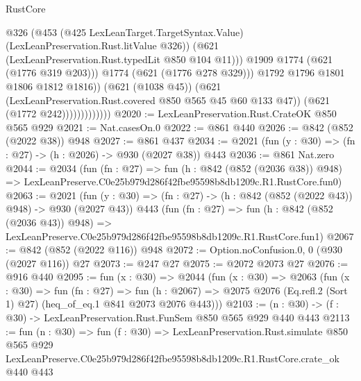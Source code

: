 \begin{lexlean}{RustCore}
\begin{coremodule}
                                    @326
                                    (@453
                                      (@425 LexLeanTarget.TargetSyntax.Value)
                                      (LexLeanPreservation.Rust.litValue @326))
                                    (@621 (LexLeanPreservation.Rust.typedLit @850 @104 @11)))
                                  @1909
                                  @1774
                                  (@621 (@1776 @319 @203)))
                                @1774
                                (@621 (@1776 @278 @329)))
                              @1792
                              @1796
                              @1801
                              @1806
                              @1812
                              @1816))
                          (@621 (@1038 @45))
                          (@621 (LexLeanPreservation.Rust.covered @850 @565 @45 @60 @133 @47))
                          (@621 (@1772 @242)))))))))))))
@2020 := LexLeanPreservation.Rust.CrateOK @850 @565 @929
@2021 := Nat.casesOn.{0}
@2022 := @861 @440
@2026 := @842 (@852 (@2022 @38)) @948
@2027 := @861 @437
@2034 := @2021 (fun (y : @30) => (fn : @27) -> (h : @2026) -> @930 (@2027 @38)) @443
@2036 := @861 Nat.zero
@2044 := @2034
    (fun (fn : @27) =>
    fun (h : @842 (@852 (@2036 @38)) @948) =>
    LexLeanPreserve.C0e25b979d286f42fbe95598b8db1209c.R1.RustCore.fun0)
@2063 := @2021
    (fun (y : @30) => (fn : @27) -> (h : @842 (@852 (@2022 @43)) @948) -> @930 (@2027 @43))
    @443
    (fun (fn : @27) =>
    fun (h : @842 (@852 (@2036 @43)) @948) =>
    LexLeanPreserve.C0e25b979d286f42fbe95598b8db1209c.R1.RustCore.fun1)
@2067 := @842 (@852 (@2022 @116)) @948
@2072 := Option.noConfusion.{0, 0} (@930 (@2027 @116)) @27
@2073 := @247 @27
@2075 := @2072 @2073 @27
@2076 := @916 @440
@2095 := fun (x : @30) =>
  @2044
    (fun (x : @30) =>
    @2063
      (fun (x : @30) =>
      fun (fn : @27) =>
      fun (h : @2067) =>
      @2075 @2076 (Eq.refl.{2} (Sort 1) @27) (heq_of_eq.{1} @841 @2073 @2076 @443)))
@2103 := (n : @30) -> (f : @30) -> LexLeanPreservation.Rust.FunSem @850 @565 @929 @440 @443
@2113 := fun (n : @30) =>
  fun (f : @30) =>
  LexLeanPreservation.Rust.simulate
    @850
    @565
    @929
    LexLeanPreserve.C0e25b979d286f42fbe95598b8db1209c.R1.RustCore.crate_ok
    @440
    @443
\end{coremodule}
\end{lexlean}
